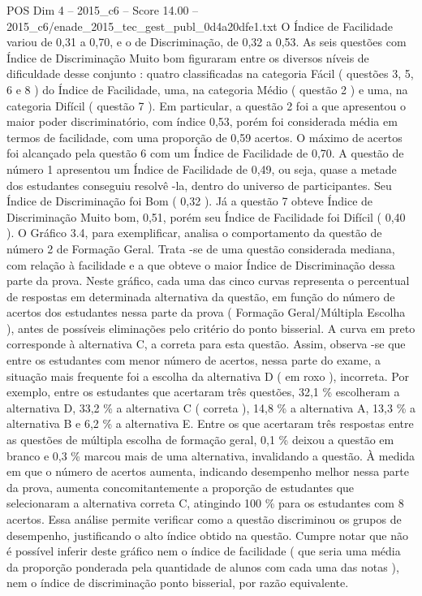 \begin{textsample}{POS Dim 4 – 2015\_c6 – Score 14.00 – 2015\_c6/enade\_2015\_tec\_gest\_publ\_0d4a20dfe1.txt}
O Índice de Facilidade variou de 0,31 a 0,70, e o de Discriminação, de 0,32 a 0,53.
As seis questões com Índice de Discriminação Muito bom figuraram entre os diversos níveis de dificuldade desse conjunto : quatro classificadas na categoria Fácil ( questões 3, 5, 6 e 8 ) do Índice de Facilidade, uma, na categoria Médio ( questão 2 ) e uma, na categoria Difícil ( questão 7 ).
Em particular, a questão 2 foi a que apresentou o maior poder discriminatório, com índice 0,53, porém foi considerada média em termos de facilidade, com uma proporção de 0,59 acertos.
O máximo de acertos foi alcançado pela questão 6 com um Índice de Facilidade de 0,70.
A questão de número 1 apresentou um Índice de Facilidade de 0,49, ou seja, quase a metade dos estudantes conseguiu resolvê -la, dentro do universo de participantes.
Seu Índice de Discriminação foi Bom ( 0,32 ).
Já a questão 7 obteve Índice de Discriminação Muito bom, 0,51, porém seu Índice de Facilidade foi Difícil ( 0,40 ).
O Gráfico 3.4, para exemplificar, analisa o comportamento da questão de número 2 de Formação Geral.
Trata -se de uma questão considerada mediana, com relação à facilidade e a que obteve o maior Índice de Discriminação dessa parte da prova.
Neste gráfico, cada uma das cinco curvas representa o percentual de respostas em determinada alternativa da questão, em função do número de acertos dos estudantes nessa parte da prova ( Formação Geral/Múltipla Escolha ), antes de possíveis eliminações pelo critério do ponto bisserial.
A curva em preto corresponde à alternativa C, a correta para esta questão.
Assim, observa -se que entre os estudantes com menor número de acertos, nessa parte do exame, a situação mais frequente foi a escolha da alternativa D ( em roxo ), incorreta.
Por exemplo, entre os estudantes que acertaram três questões, 32,1 \% escolheram a alternativa D, 33,2 \% a alternativa C ( correta ), 14,8 \% a alternativa A, 13,3 \% a alternativa B e 6,2 \% a alternativa E.
Entre os que acertaram três respostas entre as questões de múltipla escolha de formação geral, 0,1 \% deixou a questão em branco e 0,3 \% marcou mais de uma alternativa, invalidando a questão.
À medida em que o número de acertos aumenta, indicando desempenho melhor nessa parte da prova, aumenta concomitantemente a proporção de estudantes que selecionaram a alternativa correta C, atingindo 100 \% para os estudantes com 8 acertos.
Essa análise permite verificar como a questão discriminou os grupos de desempenho, justificando o alto índice obtido na questão.
Cumpre notar que não é possível inferir deste gráfico nem o índice de facilidade ( que seria uma média da proporção ponderada pela quantidade de alunos com cada uma das notas ), nem o índice de discriminação ponto bisserial, por razão equivalente.

\end{textsample}
